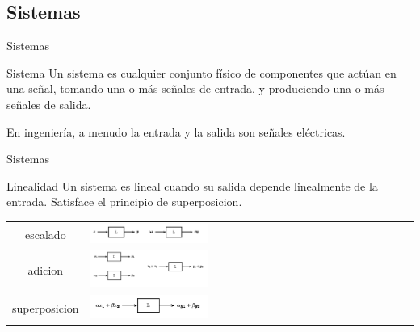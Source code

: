       \subsection{Sistemas}
      \begin{frame}{Sistemas}
         \begin{block}{Sistema}
            Un sistema es cualquier conjunto físico de componentes que actúan en una señal, tomando una o más señales de entrada, y produciendo una o más señales de salida.
         \end{block}
            En ingeniería, a menudo la entrada y la salida son señales eléctricas.\\
         \vfill
      \end{frame}
      \begin{frame}{Sistemas}
         \begin{block}{Linealidad}
            Un sistema es lineal cuando su salida depende linealmente de la entrada.
            Satisface el principio de superposicion.
         \end{block}
        \begin{centering}
            \begin{table}[h]
               \begin{tabular}{cm{6cm}cm{6cm}}
               escalado      & \includegraphics[width=0.4\textwidth]{1_clase/superposicion1}\\
               adicion       & \includegraphics[width=0.4\textwidth]{1_clase/superposicion2}\\
               superposicion & \includegraphics[width=0.4\textwidth]{1_clase/superposicion3}\\
            \end{tabular}
         \end{table}
         \end{centering}
         \vfill
      \end{frame}

